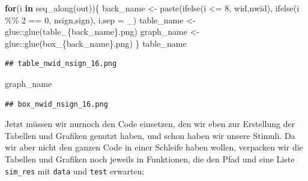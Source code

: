 \documentclass[
]{book}
\newenvironment{Shaded}{\begin{snugshade}}{\end{snugshade}}
\newcommand{\AttributeTok}[1]{\textcolor[rgb]{0.77,0.63,0.00}{#1}}
\newcommand{\ControlFlowTok}[1]{\textcolor[rgb]{0.13,0.29,0.53}{\textbf{#1}}}
\newcommand{\DecValTok}[1]{\textcolor[rgb]{0.00,0.00,0.81}{#1}}
\newcommand{\FunctionTok}[1]{\textcolor[rgb]{0.00,0.00,0.00}{#1}}
\newcommand{\NormalTok}[1]{#1}
\newcommand{\OtherTok}[1]{\textcolor[rgb]{0.56,0.35,0.01}{#1}}
\newcommand{\SpecialCharTok}[1]{\textcolor[rgb]{0.00,0.00,0.00}{#1}}
\newcommand{\StringTok}[1]{\textcolor[rgb]{0.31,0.60,0.02}{#1}}
\begin{document}
\begin{Shaded}
\begin{Highlighting}[]
\ControlFlowTok{for}\NormalTok{(i }\ControlFlowTok{in} \FunctionTok{seq\_along}\NormalTok{(out))\{}
\NormalTok{  back\_name }\OtherTok{\textless{}{-}} \FunctionTok{paste}\NormalTok{(}\FunctionTok{ifelse}\NormalTok{(i }\SpecialCharTok{\textless{}=} \DecValTok{8}\NormalTok{, }\StringTok{\textquotesingle{}wid\textquotesingle{}}\NormalTok{,}\StringTok{\textquotesingle{}nwid\textquotesingle{}}\NormalTok{),}
                     \FunctionTok{ifelse}\NormalTok{(i }\SpecialCharTok{\%\%} \DecValTok{2} \SpecialCharTok{==} \DecValTok{0}\NormalTok{, }\StringTok{\textquotesingle{}nsign\textquotesingle{}}\NormalTok{,}\StringTok{\textquotesingle{}sign\textquotesingle{}}\NormalTok{),}
\NormalTok{                     i,}\AttributeTok{sep =} \StringTok{\textquotesingle{}\_\textquotesingle{}}\NormalTok{)}
\NormalTok{  table\_name }\OtherTok{\textless{}{-}}\NormalTok{ glue}\SpecialCharTok{::}\FunctionTok{glue}\NormalTok{(}\StringTok{\textquotesingle{}table\_\{back\_name\}.png\textquotesingle{}}\NormalTok{)}
\NormalTok{  graph\_name }\OtherTok{\textless{}{-}}\NormalTok{ glue}\SpecialCharTok{::}\FunctionTok{glue}\NormalTok{(}\StringTok{\textquotesingle{}box\_\{back\_name\}.png\textquotesingle{}}\NormalTok{)}
\NormalTok{\}}
\NormalTok{table\_name}
\end{Highlighting}
\end{Shaded}

\begin{verbatim}
## table_nwid_nsign_16.png
\end{verbatim}

\begin{Shaded}
\begin{Highlighting}[]
\NormalTok{graph\_name}
\end{Highlighting}
\end{Shaded}

\begin{verbatim}
## box_nwid_nsign_16.png
\end{verbatim}

Jetzt müssen wir nurnoch den Code einsetzen, den wir eben zur Erstellung der Tabellen und Grafiken genutzt haben, und schon haben wir unsere Stimuli. Da wir aber nicht den ganzen Code in einer Schleife haben wollen, verpacken wir die Tabellen und Grafiken noch jeweils in Funktionen, die den Pfad und eine Liste \texttt{sim\_res} mit \texttt{data} und \texttt{test} erwarten:
\end{document}
